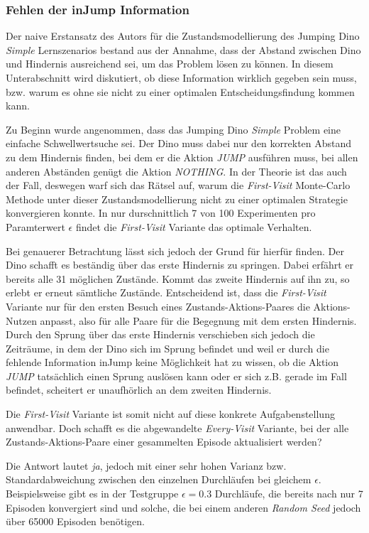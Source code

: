 \subsubsection*{Fehlen der \glqq inJump\grqq{} Information}
Der naive Erstansatz des Autors für die Zustandsmodellierung des Jumping Dino \textit{Simple} Lernszenarios bestand aus der Annahme, dass der Abstand zwischen Dino und Hindernis ausreichend sei, um das Problem lösen zu können. In diesem Unterabschnitt wird diskutiert, ob diese Information wirklich gegeben sein muss, bzw. warum es ohne sie nicht zu einer optimalen Entscheidungsfindung kommen kann.
\par 
Zu Beginn wurde angenommen, dass das Jumping Dino \textit{Simple} Problem eine einfache Schwellwertsuche sei. Der Dino muss dabei nur den korrekten Abstand zu dem Hindernis finden, bei dem er die Aktion \textit{JUMP} ausführen muss, bei allen anderen Abständen genügt die Aktion \textit{NOTHING}. In der Theorie ist das auch der Fall, deswegen warf sich das Rätsel auf, warum die \textit{First-Visit} Monte-Carlo Methode unter dieser Zustandsmodellierung nicht zu einer optimalen Strategie konvergieren konnte. In nur durschnittlich 7 von 100 Experimenten pro Paramterwert $\epsilon$ findet die \textit{First-Visit} Variante das optimale Verhalten.
\par 
Bei genauerer Betrachtung lässt sich jedoch der Grund für hierfür finden. Der Dino schafft es beständig über das erste Hindernis zu springen. Dabei erfährt er bereits alle 31 möglichen Zustände. Kommt das zweite Hindernis auf ihn zu, so erlebt er erneut sämtliche Zustände. Entscheidend ist, dass die \textit{First-Visit} Variante nur für den ersten Besuch eines Zustands-Aktions-Paares die Aktions-Nutzen anpasst, also für alle Paare für die Begegnung mit dem ersten Hindernis. Durch den Sprung über das erste Hindernis verschieben sich jedoch die Zeiträume, in dem der Dino sich im Sprung befindet und weil er durch die fehlende Information \glqq inJump\grqq{} keine Möglichkeit hat zu wissen, ob die Aktion \textit{JUMP} tatsächlich einen Sprung auslösen kann oder er sich z.B. gerade im Fall befindet, scheitert er unaufhörlich an dem zweiten Hindernis.
\par 
Die \textit{First-Visit} Variante ist somit nicht auf diese konkrete Aufgabenstellung anwendbar. Doch schafft es die abgewandelte \textit{Every-Visit} Variante, bei der alle Zustands-Aktions-Paare einer gesammelten Episode aktualisiert werden? \par 
Die Antwort lautet \textit{ja}, jedoch mit einer sehr hohen Varianz bzw. Standardabweichung zwischen den einzelnen Durchläufen bei gleichem $\epsilon$. Beispielsweise gibt es in der Testgruppe $\epsilon = 0.3$ Durchläufe, die bereits nach nur 7 Episoden konvergiert sind und solche, die bei einem anderen \textit{Random Seed} jedoch über 65000 Episoden benötigen.

